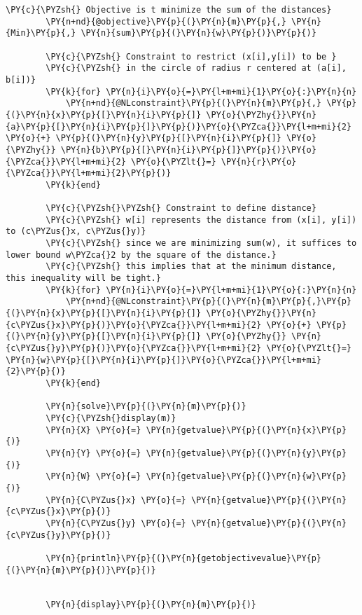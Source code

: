\begin{Verbatim}[commandchars=\\\{\}]
        \PY{c}{\PYZsh{} Objective is t minimize the sum of the distances}
        \PY{n+nd}{@objective}\PY{p}{(}\PY{n}{m}\PY{p}{,} \PY{n}{Min}\PY{p}{,} \PY{n}{sum}\PY{p}{(}\PY{n}{w}\PY{p}{)}\PY{p}{)}
        
        \PY{c}{\PYZsh{} Constraint to restrict (x[i],y[i]) to be }
        \PY{c}{\PYZsh{} in the circle of radius r centered at (a[i], b[i])}
        \PY{k}{for} \PY{n}{i}\PY{o}{=}\PY{l+m+mi}{1}\PY{o}{:}\PY{n}{n}
            \PY{n+nd}{@NLconstraint}\PY{p}{(}\PY{n}{m}\PY{p}{,} \PY{p}{(}\PY{n}{x}\PY{p}{[}\PY{n}{i}\PY{p}{]} \PY{o}{\PYZhy{}}\PY{n}{a}\PY{p}{[}\PY{n}{i}\PY{p}{]}\PY{p}{)}\PY{o}{\PYZca{}}\PY{l+m+mi}{2} \PY{o}{+} \PY{p}{(}\PY{n}{y}\PY{p}{[}\PY{n}{i}\PY{p}{]} \PY{o}{\PYZhy{}} \PY{n}{b}\PY{p}{[}\PY{n}{i}\PY{p}{]}\PY{p}{)}\PY{o}{\PYZca{}}\PY{l+m+mi}{2} \PY{o}{\PYZlt{}=} \PY{n}{r}\PY{o}{\PYZca{}}\PY{l+m+mi}{2}\PY{p}{)}
        \PY{k}{end}
        
        \PY{c}{\PYZsh{}\PYZsh{} Constraint to define distance}
        \PY{c}{\PYZsh{} w[i] represents the distance from (x[i], y[i]) to (c\PYZus{}x, c\PYZus{}y)}
        \PY{c}{\PYZsh{} since we are minimizing sum(w), it suffices to lower bound w\PYZca{}2 by the square of the distance.}
        \PY{c}{\PYZsh{} this implies that at the minimum distance, this inequality will be tight.}
        \PY{k}{for} \PY{n}{i}\PY{o}{=}\PY{l+m+mi}{1}\PY{o}{:}\PY{n}{n}
            \PY{n+nd}{@NLconstraint}\PY{p}{(}\PY{n}{m}\PY{p}{,}\PY{p}{(}\PY{n}{x}\PY{p}{[}\PY{n}{i}\PY{p}{]} \PY{o}{\PYZhy{}}\PY{n}{c\PYZus{}x}\PY{p}{)}\PY{o}{\PYZca{}}\PY{l+m+mi}{2} \PY{o}{+} \PY{p}{(}\PY{n}{y}\PY{p}{[}\PY{n}{i}\PY{p}{]} \PY{o}{\PYZhy{}} \PY{n}{c\PYZus{}y}\PY{p}{)}\PY{o}{\PYZca{}}\PY{l+m+mi}{2} \PY{o}{\PYZlt{}=} \PY{n}{w}\PY{p}{[}\PY{n}{i}\PY{p}{]}\PY{o}{\PYZca{}}\PY{l+m+mi}{2}\PY{p}{)}
        \PY{k}{end}
        
        \PY{n}{solve}\PY{p}{(}\PY{n}{m}\PY{p}{)}
        \PY{c}{\PYZsh{}display(m)}
        \PY{n}{X} \PY{o}{=} \PY{n}{getvalue}\PY{p}{(}\PY{n}{x}\PY{p}{)}
        \PY{n}{Y} \PY{o}{=} \PY{n}{getvalue}\PY{p}{(}\PY{n}{y}\PY{p}{)}
        \PY{n}{W} \PY{o}{=} \PY{n}{getvalue}\PY{p}{(}\PY{n}{w}\PY{p}{)}
        \PY{n}{C\PYZus{}x} \PY{o}{=} \PY{n}{getvalue}\PY{p}{(}\PY{n}{c\PYZus{}x}\PY{p}{)}
        \PY{n}{C\PYZus{}y} \PY{o}{=} \PY{n}{getvalue}\PY{p}{(}\PY{n}{c\PYZus{}y}\PY{p}{)}
        
        \PY{n}{println}\PY{p}{(}\PY{n}{getobjectivevalue}\PY{p}{(}\PY{n}{m}\PY{p}{)}\PY{p}{)}
        
        
        \PY{n}{display}\PY{p}{(}\PY{n}{m}\PY{p}{)}
\end{Verbatim}


